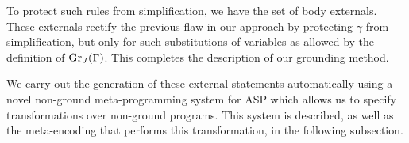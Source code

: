 To protect such rules from simplification, we have the set of body
externals. These externals rectify the previous flaw in our approach
by protecting $\gamma$ from simplification, but only for such
substitutions of variables as allowed by the definition of
$\operatorname{Gr}_{J}(\Gamma)$. This completes the description of our grounding
method.

We carry out the generation of these external statements automatically
using a novel non-ground meta-programming system for ASP which allows
us to specify transformations over non-ground programs. This system is
described, as well as the meta-encoding that performs this
transformation, in the following subsection.
